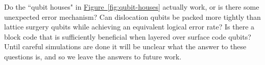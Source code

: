 \documentclass[a4paper, onecolumn, accepted=2021-03-29]{quantumarticle}
\newcommand{\fig}[1]{\hyperref[fig:#1]{Figure~\ref*{fig:#1}}}
\begin{document}
Do the ``qubit houses" in \fig{qubit-houses} actually work, or is there some unexpected error mechanism?
Can dislocation qubits be packed more tightly than lattice surgery qubits while achieving an equivalent logical error rate?
Is there a block code that is sufficiently beneficial when layered over surface code qubits?
Until careful simulations are done it will be unclear what the answer to these questions is, and so we leave the answers to future work.

\begin{figure}

\end{figure}
\end{document}
